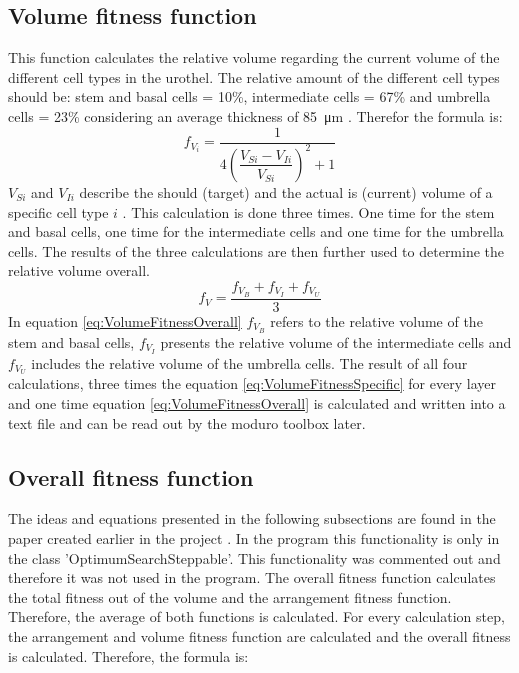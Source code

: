 \subsection{Volume fitness function} \label{subsec:VolumeFitness}
This function calculates the relative volume regarding the current volume of the different cell types in the urothel. The relative amount of the different cell types should be: stem and basal cells = 10\%, intermediate cells = 67\% and umbrella cells = 23\% considering an average thickness of \SI{85}{\micro\metre} \cite{Torelli2017}. Therefor the formula is:
\begin{equation}\label{eq:VolumeFitnessSpecific}
f_{V_{i}} = \dfrac{1}{4 (\dfrac{V_{Si}-V_{Ii}}{V_{Si}})^2 + 1}
\end{equation}
$V_{Si}$ and $V_{Ii}$ describe the should (target) and the actual is (current) volume of a specific cell type $i$ \cite{Torelli2017}.  This calculation is done three times. One time for the stem and basal cells, one time for the intermediate cells and one time for the umbrella cells. The results of the three calculations are then further used to determine the relative volume overall.
\begin{equation}\label{eq:VolumeFitnessOverall}
f_{V} = \dfrac{f_{V_{B}} + f_{V_{I}} + f_{V_{U}}}{3}
\end{equation}
In equation \ref{eq:VolumeFitnessOverall} $f_{V_{B}}$ refers to the relative volume of the stem and basal cells, $f_{V_{I}}$ presents the relative volume of the intermediate cells and $f_{V_{U}}$ includes the relative volume of the umbrella cells. \newline
The result of all four calculations, three times the equation \ref{eq:VolumeFitnessSpecific} for every layer and one time equation \ref{eq:VolumeFitnessOverall} is calculated and written into a text file and can be read out by the moduro toolbox later.


\subsection{Overall fitness function}
The ideas and equations presented in the following subsections are found in the paper created earlier in the project \cite{Torelli2017}. In the program this functionality is only in the class 'OptimumSearchSteppable'. This functionality was commented out and therefore it was not used in the program. \newline
The overall fitness function calculates the total fitness out of the volume and the arrangement fitness function. Therefore, the average of both functions is calculated. For every calculation step, the arrangement and volume fitness function are calculated and the overall fitness is calculated. Therefore, the formula is:

